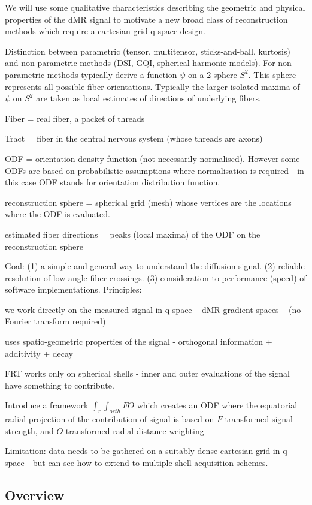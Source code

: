 \documentclass{bioinfo}
\begin{document}
We will use some qualitative characteristics describing the geometric
and physical properties of the dMR signal to motivate a new broad class
of reconstruction methods which require a cartesian grid q-space design.

Distinction between parametric (tensor, multitensor, sticks-and-ball,
kurtosis) and non-parametric methods (DSI, GQI, spherical harmonic
models). For non-parametric methods typically derive a function $\psi$
on a 2-sphere $S^2$. This sphere represents all possible fiber
orientations. Typically the larger isolated maxima of $\psi$ on $S^2$
are taken as local estimates of directions of underlying fibers.

Fiber = real fiber, a packet of threads

Tract = fiber in the central nervous system (whose threads are axons)

ODF = orientation density function (not necessarily normalised). However
some ODFs are based on probabilistic assumptions where normalisation is
required - in this case ODF stands for orientation distribution function.

reconstruction sphere = spherical grid (mesh) whose vertices are the
locations where the ODF is evaluated.

estimated fiber directions = peaks (local maxima) of the ODF on the
reconstruction sphere

Goal: (1) a simple and general way to understand the diffusion
signal. (2) reliable resolution of low angle fiber crossings. (3)
consideration to performance (speed) of software implementations.
Principles:

we work directly on the measured signal in q-space -- dMR gradient
spaces -- (no Fourier transform required)

uses spatio-geometric properties of the signal - orthogonal information
+ additivity + decay

FRT works only on spherical shells - inner and outer evaluations of the
signal have something to contribute.

Introduce a framework $\int_r \int_{orth} F O$ which creates an ODF
where the equatorial radial projection of the contribution of signal is
based on $F$-transformed signal strength, and $O$-transformed radial
distance weighting

Limitation: data needs to be gathered on a suitably dense cartesian grid
in q-space - but can see how to extend to multiple shell acquisition
schemes.


\subsection{Overview}
\end{document}
